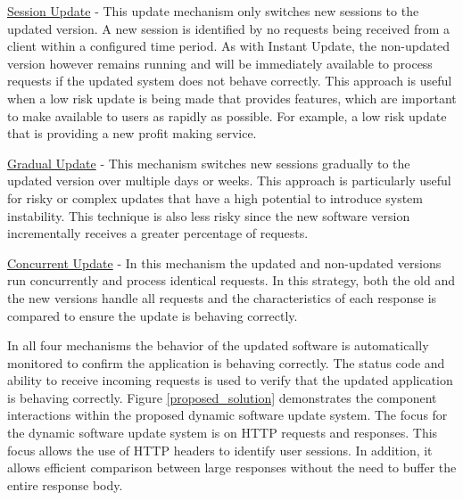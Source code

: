 \documentclass[a4paper,11pt,twoside]{article}
\begin{document}
\underline{Session Update} - This update mechanism only switches new sessions to the updated version. A new session is identified by no requests being received from a client within a configured time period. As with Instant Update, the non-updated version however remains running and will be immediately available to process requests if the updated system does not behave correctly. This approach is useful when a low risk update is being made that provides features, which are important to make available to users as rapidly as possible. For example, a low risk update that is providing a new profit making service.

\underline{Gradual Update} - This mechanism switches new sessions gradually to the updated version over multiple days or weeks. This approach is particularly useful for risky or complex updates that have a high potential to introduce system instability. This technique is also less risky since the new software version incrementally receives a greater percentage of requests.

\underline{Concurrent Update} - In this mechanism the updated and non-updated versions run concurrently and process identical requests.  In this strategy, both the old and the new versions handle all requests and the characteristics of each response is compared to ensure the update is behaving correctly.

In all four mechanisms the behavior of the updated software is automatically monitored to confirm the application is behaving correctly. The status code and ability to receive incoming requests is used to verify that the updated application is behaving correctly. Figure \ref{proposed_solution} demonstrates the component interactions within the proposed dynamic software update system. The focus for the dynamic software update system is on HTTP requests and responses.  This focus allows the use of HTTP headers to identify user sessions.  In addition, it allows efficient comparison between large responses without the need to buffer the entire response body.\bigskip
\end{document}
